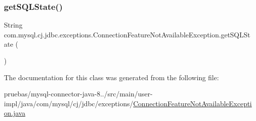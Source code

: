 \subsubsection{\texorpdfstring{get\+S\+Q\+L\+State()}{getSQLState()}}
{\footnotesize\ttfamily String com.\+mysql.\+cj.\+jdbc.\+exceptions.\+Connection\+Feature\+Not\+Available\+Exception.\+get\+S\+Q\+L\+State (\begin{DoxyParamCaption}{ }\end{DoxyParamCaption})}



The documentation for this class was generated from the following file\+:\begin{DoxyCompactItemize}
\item 
pruebas/mysql-\/connector-\/java-\/8../src/main/user-\/impl/java/com/mysql/cj/jdbc/exceptions/\mbox{\hyperlink{_connection_feature_not_available_exception_8java}{Connection\+Feature\+Not\+Available\+Exception.\+java}}\end{DoxyCompactItemize}
